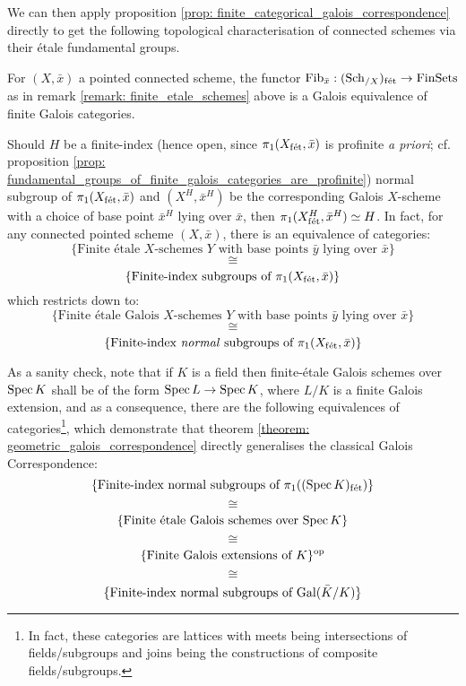                 We can then apply proposition \ref{prop: finite_categorical_galois_correspondence} directly to get the following topological characterisation of connected schemes via their \'etale fundamental groups.
                \begin{theorem} \label{theorem: geometric_galois_correspondence}
                    For $(X, \bar{x})$ a pointed connected scheme, the functor $\mathrm{Fib}_{\bar{x}}: (\mathrm{Sch}_{/X})_{\mathrm{f\acute{e}t}} \to \mathrm{Fin}\mathrm{Sets}$ as in remark \ref{remark: finite_etale_schemes} above is a Galois equivalence of finite Galois categories. 
                \end{theorem}
                \begin{corollary}
                    Should $H$ be a finite-index (hence open, since $\pi_1(X_{\mathrm{f\acute{e}t}}, \bar{x})$ is profinite \textit{a priori}; cf. proposition \ref{prop: fundamental_groups_of_finite_galois_categories_are_profinite}) normal subgroup of $\pi_1(X_{\mathrm{f\acute{e}t}}, \bar{x})$ and $(X^H, \bar{x}^H)$ be the corresponding Galois $X$-scheme with a choice of base point $\bar{x}^H$ lying over $\bar{x}$, then $\pi_1(X^H_{\mathrm{f\acute{e}t}}, \bar{x}^H) \simeq H$. In fact, for any connected pointed scheme $(X, \bar{x})$, there is an equivalence of categories:
                        $$\{\text{Finite \'etale $X$-schemes $Y$ with base points $\bar{y}$ lying over $\bar{x}$}\}$$
                        $$\cong$$
                        $$\{\text{Finite-index subgroups of $\pi_1(X_{\mathrm{f\acute{e}t}}, \bar{x})$}\}$$
                    which restricts down to:
                        $$\{\text{Finite \'etale Galois $X$-schemes $Y$ with base points $\bar{y}$ lying over $\bar{x}$}\}$$
                        $$\cong$$
                        $$\{\text{Finite-index \textit{normal} subgroups of $\pi_1(X_{\mathrm{f\acute{e}t}}, \bar{x})$}\}$$
                \end{corollary}
                \begin{example} \label{example: etale_fundamental_group_of_a_field}
                    As a sanity check, note that if $K$ is a field then finite-\'etale Galois schemes over $\operatorname{Spec} K$ shall be of the form $\operatorname{Spec} L \to \operatorname{Spec} K$, where $L/K$ is a finite Galois extension, and as a consequence, there are the following equivalences of categories\footnote{In fact, these categories are lattices with meets being intersections of fields/subgroups and joins being the constructions of composite fields/subgroups.}, which demonstrate that theorem \ref{theorem: geometric_galois_correspondence} directly generalises the classical Galois Correspondence:
                        $$\{\text{Finite-index normal subgroups of $\pi_1((\operatorname{Spec} K)_{\mathrm{f\acute{e}t}})$}\}$$
                        $$\cong$$
                        $$\{\text{Finite \'etale Galois schemes over $\operatorname{Spec} K$}\}$$
                        $$\cong$$
                        $$\{\text{Finite Galois extensions of $K$}\}^{\mathrm{op}}$$
                        $$\cong$$
                        $$\{\text{Finite-index normal subgroups of $\mathrm{Gal}(\bar{K}/K)$}\}$$
                \end{example}
